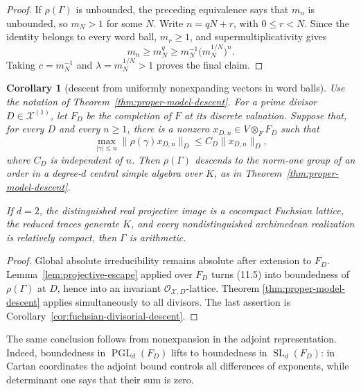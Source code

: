 \documentclass[11pt,reqno]{amsart}
\newtheorem{corollary}[theorem]{Corollary}
\theoremstyle{definition}
\theoremstyle{remark}
\newcommand{\SL}{\operatorname{SL}}
\newcommand{\PGL}{\operatorname{PGL}}
\begin{document}
\begin{proof}
If \(\rho(\Gamma)\) is unbounded, the preceding equivalence says that
\(m_n\) is unbounded, so
\(m_N>1\) for some \(N\).  Write \(n=qN+r\), with \(0\le r<N\).
Since the identity belongs to every word ball, \(m_r\ge1\), and
supermultiplicativity gives
\[
 m_n\ge m_N^q\ge m_N^{-1}\bigl(m_N^{1/N}\bigr)^n.
\]
Taking \(c=m_N^{-1}\) and \(\lambda=m_N^{1/N}>1\) proves the final claim.
\end{proof}

\begin{corollary}[descent from uniformly nonexpanding vectors in word balls]
\label{cor:valuative-nonexpansion}
Use the notation of Theorem~\ref{thm:proper-model-descent}.  For a prime
divisor \(D\in\mathcal X^{(1)}\), let \(F_D\) be the completion of \(F\) at
its discrete valuation.  Suppose that, for every \(D\) and every \(n\ge1\),
there is a nonzero \(x_{D,n}\in V\otimes_FF_D\) such that
\[
 \max_{|\gamma|\le n}\|\rho(\gamma)x_{D,n}\|_D
       \le C_D\|x_{D,n}\|_D,
 \tag{11.5}
\]
where \(C_D\) is independent of \(n\).  Then \(\rho(\Gamma)\) descends to
the norm-one group of an order in a degree-\(d\) central simple algebra over
\(K\), as in Theorem~\ref{thm:proper-model-descent}.

If \(d=2\), the distinguished real projective image is a cocompact Fuchsian
lattice, the reduced traces generate \(K\), and every nondistinguished
archimedean realization is relatively compact, then \(\Gamma\) is
arithmetic.
\end{corollary}

\begin{proof}
Global absolute irreducibility remains absolute after extension to \(F_D\).
Lemma~\ref{lem:projective-escape} applied over \(F_D\) turns (11.5) into
boundedness of \(\rho(\Gamma)\) at \(D\), hence into an invariant
\(\mathcal O_{\mathcal X,D}\)-lattice.  Theorem
\ref{thm:proper-model-descent} applies simultaneously to all divisors.  The
last assertion is Corollary~\ref{cor:fuchsian-divisorial-descent}.
\end{proof}

The same conclusion follows from nonexpansion in the adjoint representation.
Indeed, boundedness in \(\PGL_d(F_D)\) lifts to boundedness in
\(\SL_d(F_D)\): in Cartan coordinates the adjoint bound controls all
differences of exponents, while determinant one says that their sum is zero.
\end{document}
